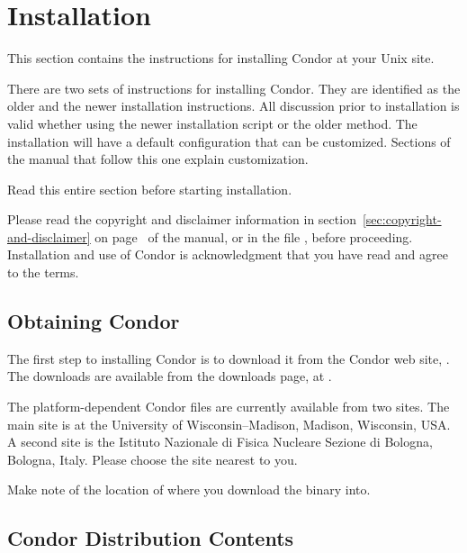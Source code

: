 \section{\label{sec:install}Installation}

This section contains the instructions for installing Condor at your
Unix site.

There are two sets of instructions for installing Condor.
They are identified as the older and the newer installation
instructions.
All discussion prior to installation is valid whether using
the newer installation script or the older method.
The installation will have a default configuration that can
be customized.
Sections of the manual that follow this one explain customization.

Read this entire section before starting installation.

Please read the copyright and disclaimer information in 
section~\ref{sec:copyright-and-disclaimer} on
page~\pageref{sec:copyright-and-disclaimer} of the manual, or in the
file , before proceeding.  Installation and
use of Condor is acknowledgment that you have read and agree to the
terms.

\subsection{\label{sec:pre-install-procedure}
Obtaining Condor}
The first step to installing Condor is to download it from the Condor
web site, .
The downloads are available from the downloads page,
at .

The platform-dependent Condor files are currently available from two sites.
The main site is at the University of Wisconsin--Madison,
Madison, Wisconsin, USA.
A second site is the Istituto Nazionale di Fisica Nucleare Sezione di
Bologna, Bologna, Italy.
Please choose the site nearest to you.

Make note of the location of where you download the binary into.

\subsection{\label{sec:install-contents}
Condor Distribution Contents}

